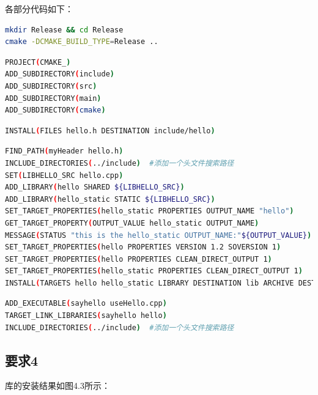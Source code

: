 \documentclass[40pt,a4paper，UTF8]{ctexart}
\begin{document}
各部分代码如下：



\begin{lstlisting}[language=bash, caption=按照Release方式编译工程]
mkdir Release && cd Release
cmake -DCMAKE_BUILD_TYPE=Release .. 
\end{lstlisting}


\begin{lstlisting}[language=bash, caption=工程/CMakeLists.txt]
PROJECT(CMAKE_)
ADD_SUBDIRECTORY(include)
ADD_SUBDIRECTORY(src)
ADD_SUBDIRECTORY(main)
ADD_SUBDIRECTORY(cmake)
\end{lstlisting}


\begin{lstlisting}[language=bash, caption=include/CMakeLists.txt]
INSTALL(FILES hello.h DESTINATION include/hello)
\end{lstlisting}


\begin{lstlisting}[language=bash, caption=src/CMakeLists.txt]
FIND_PATH(myHeader hello.h)
INCLUDE_DIRECTORIES(../include)  #添加一个头文件搜索路径
SET(LIBHELLO_SRC hello.cpp)
ADD_LIBRARY(hello SHARED ${LIBHELLO_SRC})
ADD_LIBRARY(hello_static STATIC ${LIBHELLO_SRC})
SET_TARGET_PROPERTIES(hello_static PROPERTIES OUTPUT_NAME "hello")
GET_TARGET_PROPERTY(OUTPUT_VALUE hello_static OUTPUT_NAME)
MESSAGE(STATUS "this is the hello_static OUTPUT_NAME:"${OUTPUT_VALUE})
SET_TARGET_PROPERTIES(hello PROPERTIES VERSION 1.2 SOVERSION 1)
SET_TARGET_PROPERTIES(hello PROPERTIES CLEAN_DIRECT_OUTPUT 1)
SET_TARGET_PROPERTIES(hello_static PROPERTIES CLEAN_DIRECT_OUTPUT 1)
INSTALL(TARGETS hello hello_static LIBRARY DESTINATION lib ARCHIVE DESTINATION lib)
\end{lstlisting}


\begin{lstlisting}[language=bash, caption=main/CMakeLists.txt]
ADD_EXECUTABLE(sayhello useHello.cpp)
TARGET_LINK_LIBRARIES(sayhello hello)
INCLUDE_DIRECTORIES(../include)  #添加一个头文件搜索路径
\end{lstlisting}

\paragraph{}


\subsection{要求4} 
库的安装结果如图4.3所示：
\end{document}
